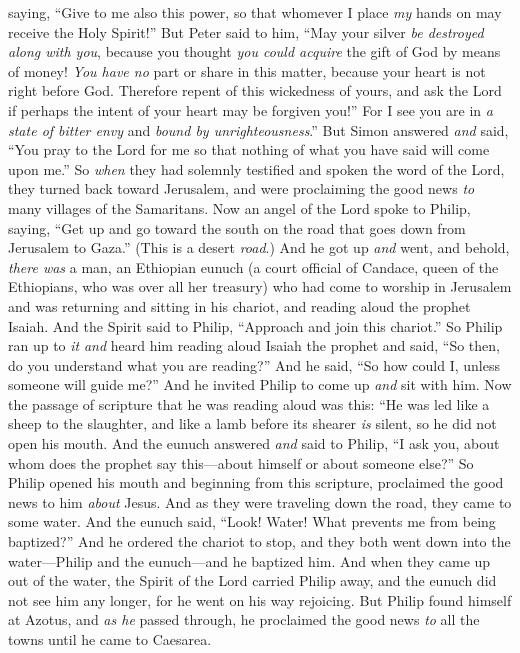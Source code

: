 \begin{biblechapter}
\verse saying, “Give to me also this power, so that whomever I place \textit{my} hands on may receive the Holy Spirit!”
\verse But Peter said to him, “May your silver \textit{be destroyed along with you}, because you thought \textit{you could acquire} the gift of God by means of money!
\verse \textit{You have no} part or share in this matter, because your heart is not right before God.
\verse Therefore repent of this wickedness of yours, and ask the Lord if perhaps the intent of your heart may be forgiven you!”
\verse For I see you are in \textit{a state of bitter envy} and \textit{bound by unrighteousness}.”
\verse But Simon answered \textit{and} said, “You pray to the Lord for me so that nothing of what you have said will come upon me.”
\verse So \textit{when} they had solemnly testified and spoken the word of the Lord, they turned back toward Jerusalem, and were proclaiming the good news \textit{to} many villages of the Samaritans.
 Now an angel of the Lord spoke to Philip, saying, “Get up and go toward the south on the road that goes down from Jerusalem to Gaza.” (This is a desert \textit{road}.)
\verse And he got up \textit{and} went, and behold, \textit{there was} a man, an Ethiopian eunuch (a court official of Candace, queen of the Ethiopians, who was over all her treasury) who had come to worship in Jerusalem
\verse and was returning and sitting in his chariot, and reading aloud the prophet Isaiah.
\verse And the Spirit said to Philip, “Approach and join this chariot.”
\verse So Philip ran up to \textit{it} \textit{and} heard him reading aloud Isaiah the prophet and said, “So then, do you understand what you are reading?”
\verse And he said, “So how could I, unless someone will guide me?” And he invited Philip to come up \textit{and} sit with him.
\verse Now the passage of scripture that he was reading aloud was this:
\verse “He was led like a sheep to the slaughter, 
and like a lamb before its shearer \textit{is} silent, 
so he did not open his mouth.
\verse And the eunuch answered \textit{and} said to Philip, “I ask you, about whom does the prophet say this—about himself or about someone else?”
\verse So Philip opened his mouth and beginning from this scripture, proclaimed the good news to him \textit{about} Jesus.
\verse And as they were traveling down the road, they came to some water. And the eunuch said, “Look! Water! What prevents me from being baptized?”
\verse And he ordered the chariot to stop, and they both went down into the water—Philip and the eunuch—and he baptized him.
\verse And when they came up out of the water, the Spirit of the Lord carried Philip away, and the eunuch did not see him any longer, for he went on his way rejoicing.
\verse But Philip found himself at Azotus, and \textit{as he} passed through, he proclaimed the good news \textit{to} all the towns until he came to Caesarea.
\end{biblechapter}

